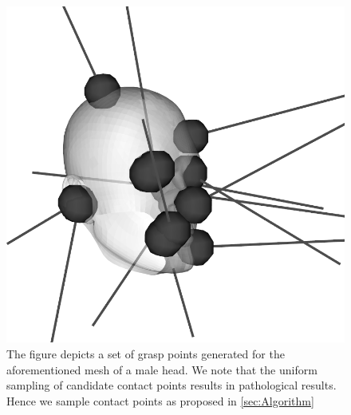\begin{figure}[t!]
  \begin{center}
    \includegraphics[width=0.75\linewidth]{images/maleHead-graspPoints-v1}
  \end{center}
  \vspace{-10pt}
\caption{ The figure depicts a set of grasp points generated for the aforementioned mesh of a male head. We note that the uniform sampling of candidate contact points results in pathological results. Hence we sample contact points as proposed in \ref{sec:Algorithm}}
  \vspace*{-15pt}
  \label{fig:maleHead-graspPoints}
\end{figure}